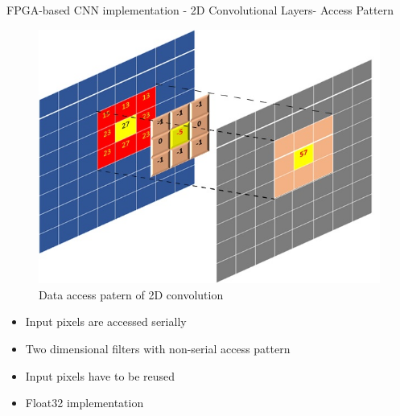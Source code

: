 \begin{frame}{FPGA-based CNN implementation - 2D Convolutional Layers- Access Pattern}
	\begin{minipage}{0.45\textwidth}
    	\begin{figure}[H]
            \centering
    		\includegraphics[width=1\textwidth]{Images/Diagrams/convolution_access_pattern.jpg}
            \caption*{Data access patern of 2D convolution}
    	\end{figure}%
	\end{minipage}%
	\begin{minipage}{0.55\textwidth}
    	\begin{itemize}
    	    \item Input pixels are accessed serially
    	    \item Two dimensional filters with non-serial access pattern
    	    \item Input pixels have to be reused
    	    \item Float32 implementation
    	\end{itemize}
	\end{minipage}%
\end{frame}

